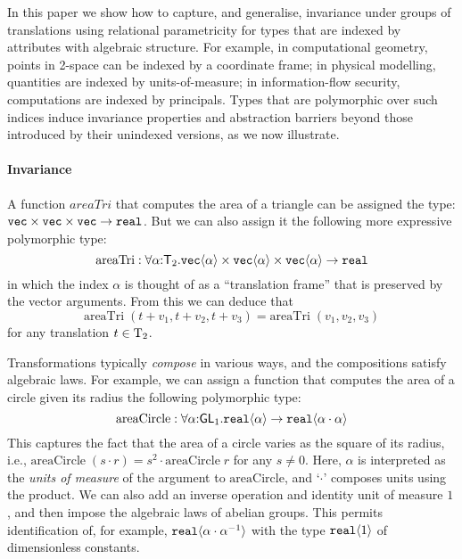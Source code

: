In this paper we show how to capture, and generalise, invariance under
groups of translations using
relational parametricity for types that are indexed by attributes with
algebraic structure. For example, in computational geometry, points in
2-space can be indexed by a coordinate frame; in physical modelling,
quantities are indexed by units-of-measure; in information-flow
security, computations are indexed by principals.  Types that are
polymorphic over such indices induce invariance properties and
abstraction barriers beyond those introduced by their unindexed
versions, as we now illustrate.

\paragraph{Invariance}
A function $\mathit{areaTri}$ that computes the area of a triangle
can be assigned the type:
$\textup{\texttt{vec}}\times\textup{\texttt{vec}}\times\textup{\texttt{vec}}\to\texttt{real}$.
But we can also assign it the following more expressive polymorphic
type:
\[
\mathrm{areaTri} : \forall\alpha\mathord:\mathsf{T}_2.
  \textup{\texttt{vec}}\langle \alpha \rangle \times \textup{\texttt{vec}}\langle \alpha \rangle \times \textup{\texttt{vec}}\langle \alpha \rangle \to \texttt{real} \\
\]
in which the index $\alpha$ is thought of as a ``translation frame''
that is preserved by the vector arguments. From this we can deduce
that
\[
\mathrm{areaTri}\;(t + v_1, t + v_2, t + v_3) = 
\mathrm{areaTri}\;(v_1, v_2, v_3)
\]
for any translation $t\in\mathrm{T}_2$.

Transformations typically \emph{compose} in various
ways, and the compositions satisfy algebraic laws. For example, 
we can assign a function that computes the area of a circle given its
radius the following polymorphic type:
\[
\mathrm{areaCircle} : \forall\alpha\mathord:\mathsf{GL}_1.\textup{\texttt{real}}\langle \alpha \rangle\to
\textup{\texttt{real}}\langle \alpha\cdot\alpha \rangle
\]
This captures the fact that the area of a circle varies as the square
of its radius, i.e., $\mathrm{areaCircle}\;(s\cdot r) =
s^2\cdot \mathrm{areaCircle}\;r$ for any $s\neq 0$.  Here, $\alpha$ is interpreted as
the \emph{units of measure} of the argument to $\mathrm{areaCircle}$,
and `$\cdot$' composes units using the product. We can also add an
inverse operation and identity unit of measure $1$, and then impose the
algebraic laws of abelian groups. This permits identification of, for
example, $\textup{\texttt{real}}\langle \alpha\cdot\alpha^{-1} \rangle$ with the type
$\textup{\texttt{real}}\langle 1 \rangle$ of dimensionless constants.

